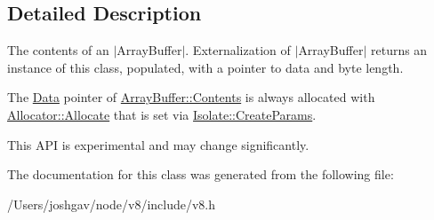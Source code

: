 \subsection{Detailed Description}
The contents of an $\vert$\+Array\+Buffer$\vert$. Externalization of $\vert$\+Array\+Buffer$\vert$ returns an instance of this class, populated, with a pointer to data and byte length.

The \hyperlink{classv8_1_1_data}{Data} pointer of \hyperlink{classv8_1_1_array_buffer_1_1_contents}{Array\+Buffer\+::\+Contents} is always allocated with \hyperlink{classv8_1_1_array_buffer_1_1_allocator_a106b0d80120ed04fe9b9675e96f0340b}{Allocator\+::\+Allocate} that is set via \hyperlink{structv8_1_1_isolate_1_1_create_params}{Isolate\+::\+Create\+Params}.

This A\+PI is experimental and may change significantly. 

The documentation for this class was generated from the following file\+:\begin{DoxyCompactItemize}
\item 
/\+Users/joshgav/node/v8/include/v8.\+h\end{DoxyCompactItemize}
